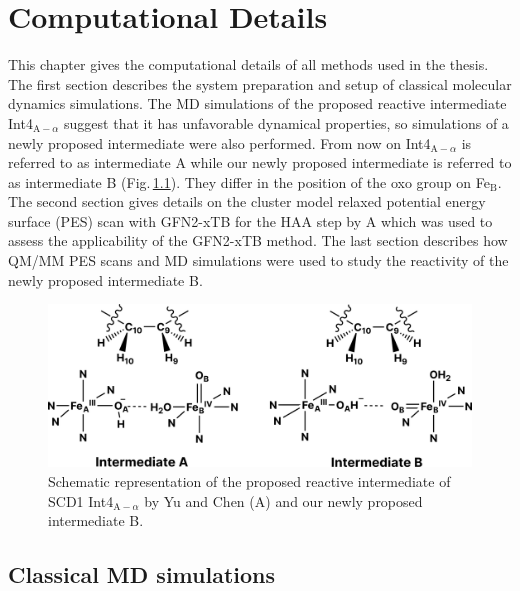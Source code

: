\chapter{Computational Details}
This chapter gives the computational details of all methods used in the thesis. The first section describes the system preparation and setup of classical molecular dynamics simulations. The MD simulations of the proposed reactive intermediate Int4$_{\text{A}-\alpha}$ suggest that it has unfavorable dynamical properties, so simulations of a newly proposed intermediate were also performed. From now on Int4$_{\text{A}-\alpha}$ is referred to as intermediate A while our newly proposed intermediate is referred to as intermediate B (Fig.\,\ref{fig:IntA_IntB}). They differ in the position of the oxo group on Fe$_{\text{B}}$. The second section gives details on the cluster model relaxed potential energy surface (PES) scan with GFN2-xTB \cite{Bannwarth2019,Grimme2017} for the HAA step by A which was used to assess the applicability of the GFN2-xTB method. The last section describes how QM/MM PES scans and MD simulations were used to study the reactivity of the newly proposed intermediate B.
\begin{figure}[htbp]
    \centering
    \includegraphics[width=0.8 \textwidth]{Figures/int_A_B.pdf}
    \caption{Schematic representation of the proposed reactive intermediate of SCD1 Int4$_{\text{A}-\alpha}$ by Yu and Chen (A) \cite{Yu2019} and our newly proposed intermediate B.}
    \label{fig:IntA_IntB}
\end{figure}

\section{Classical MD simulations}
